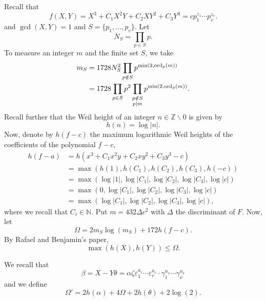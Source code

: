 Recall that 
\[f(X,Y) = X^3 + C_1 X^{2}Y + C_2XY^2 + C_3Y^3 = c p_1^{z_1} \cdots p_v^{z_v}.\]
and $\gcd(X,Y)=1$ and $S = \{p_1, \dots, p_v\}$. Let 
\[N_S = \prod_{p\in S}p.\]
To measure an integer $m$ and the finite set $S$, we take
\begin{align*}
m_S	& = 1728 N_S^2 \prod_{p \notin S} p^{\min(2,\operatorname{ord}_p(m))}\\
	& = 1728 \prod_{p\in S}p^2 \prod_{\substack{p \notin S \\ p \mid m}} p^{\min(2,\operatorname{ord}_p(m))}.
\end{align*}
Recall further that the Weil height of an integer $n \in \mathbb{Z}\backslash {0}$ is given by
\[h(n) = \log|n|.\] 
Now, denote by $h(f-c)$ the maximum logarithmic Weil heights of the coefficients of the polynomial $f - c$,
\begin{align*}
h(f-a)	& = h(x^3 + C_1 x^{2}y + C_2xy^2 + C_3y^3 - c)\\
		& = \max(h(1), h(C_1), h(C_2), h(C_3), h(-c))\\
		& = \max(\log|1|, \log|C_1|, \log|C_2|, \log|C_3|, \log|c|)\\
		& = \max(0, \log|C_1|, \log|C_2|, \log|C_3|, \log|c|)\\
		& = \max(\log|C_1|, \log|C_2|, \log|C_3|, \log|c|),		
\end{align*}
where we recall that $C_i \in \mathbb{N}$.
Put $m = 432 \Delta c^2$ with $\Delta$ the discriminant of $F$. Now, let 
\[\Omega = 2m_S \log(m_S) + 172h(f-c).\]
By Rafael and Benjamin's paper, 
\[\max(h(X),h(Y))\leq \Omega. \]

We recall that  
\[\beta = X-Y\theta = \alpha \zeta \varepsilon_1^{a_1} \cdots \varepsilon_r^{a_r}\cdot \gamma_1^{n_1}\cdots \gamma_{\nu}^{n_{\nu}}\]
and we define
\[\Omega' = 2h(\alpha) + 4\Omega + 2h(\theta) + 2\log(2).\]

